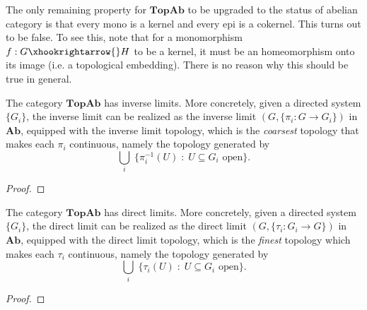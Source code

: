 \begin{remark} The only remaining property for $\textbf{TopAb}$ to be upgraded to the status of abelian category is that every mono is a kernel and every epi is a cokernel. This turns out to be false. To see this, note that for a monomorphism $f : G \xhookrightarrow{} H$ to be a kernel, it must be an homeomorphism onto its image (i.e. a topological embedding). There is no reason why this should be true in general.
\end{remark}

\begin{proposition} The category $\textbf{TopAb}$ has inverse limits. More concretely, given a directed system $\{G_i\}$, the inverse limit can be realized as the inverse limit $(G, \{\pi_i : G \rightarrow G_i\})$ in $\textbf{Ab}$, equipped with the inverse limit topology, which is the \emph{coarsest} topology that makes each $\pi_i$ continuous, namely the topology generated by
$$\bigcup_i \; \{\pi_i^{-1}(U) \;:\; U \subseteq G_i \text{ open}\}.$$
\end{proposition}
\begin{proof} \TODO
\end{proof}

\begin{proposition} The category $\textbf{TopAb}$ has direct limits. More concretely, given a directed system $\{G_i\}$, the direct limit can be realized as the direct limit $(G, \{\tau_i : G_i \rightarrow G\})$ in $\textbf{Ab}$, equipped with the direct limit topology, which is the \emph{finest} topology which makes each $\tau_i$ continuous, namely the topology generated by $$\bigcup_i \; \{\tau_i(U) \;:\; U \subseteq G_i \text{ open}\}.$$
\end{proposition}
\begin{proof} \TODO
\end{proof}






